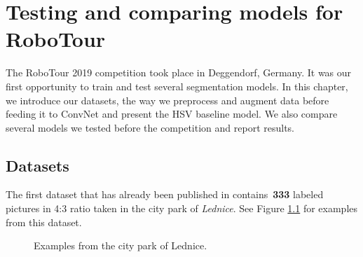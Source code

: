 \chapter{Testing and comparing models for RoboTour}
\label{chapter:testingandcomparing}

The RoboTour 2019 competition took place in Deggendorf, Germany. It was our first
opportunity to train and test several segmentation models. In this chapter, we introduce
our datasets, the way we preprocess and augment data before feeding it to ConvNet and
present the HSV baseline model.
We also compare several models we tested before the competition and report results.

\section{Datasets}
\label{sec:datasets}

The first dataset that has already been published in \cite{bib:suppajariabka2017}
contains~\textbf{333} labeled pictures in 4:3 ratio taken in the city park of
\textit{Lednice}. See Figure \ref{img:lednice_examples} for examples from this dataset.

\begin{figure}[!h]
	\begin{center}
		\quad
	\end{center}
	\caption[Examples from the city park of Lednice]{Examples from the city park of Lednice.}
	\label{img:lednice_examples}
\end{figure}


